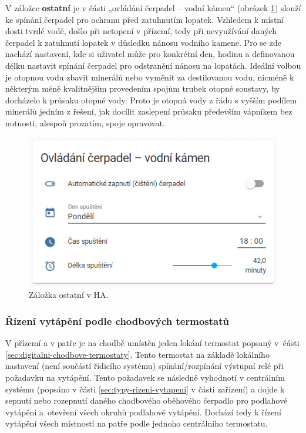V záložce \textbf{ostatní} je v části „ovládání čerpadel – vodní kámen“ (obrázek \ref{fig:zalozka-ostatni}) slouží ke spínání čerpadel pro ochranu před zatuhnutím lopatek. Vzhledem k místní dosti tvrdé vodě, došlo při netopení v přízemí, tedy při nevyužívání daných čerpadel k zatuhnutí lopatek v důsledku nánosu vodního kamene. Pro se zde nachází nastavení, kde si uživatel může pro konkrétní den, hodinu a definovanou délku nastavit spínání čerpadel pro odstranění nánosu na lopatách. Ideální volbou je otopnou vodu zbavit minerálů nebo vyměnit za destilovanou vodu, nicméně k některým méně kvalitnějším provedením spojům trubek otopné soustavy, by docházelo k průsaku otopné vody. Proto je otopná vody z řádu s vyšším podílem minerálů jedním z řešení, jak docílit zaslepení průsaku především vápníkem bez nutnosti, alespoň prozatím, spoje opravovat.

\begin{figure}[H]
    \centering
    \includegraphics[width=\textwidth]{images/software-ha/zalozka-ostatni.png}
    \caption{Záložka ostatní v HA.}
    \label{fig:zalozka-ostatni}
\end{figure}


\subsubsection{Řízení vytápění podle chodbových termostatů}
V přízemí a v patře je na chodbě umístěn jeden lokání termostat popsaný v~části \ref{sec:digitalni-chodbove-termostaty}. Tento termostat na základě lokálního nastavení (není součástí řídicího systému) spínání/rozpínání výstupní relé při požadavku na vytápění. Tento požadavek se následně vyhodnotí v centrálním systému (popsáno v části \ref{sec:typy-rizeni-vytapeni} v části zařízení) a dojde k sepnutí nebo rozepnutí daného chodbového oběhového čerpadlo pro podlahové vytápění a~otevření všech okruhů podlahové vytápění. Dochází tedy k řízení vytápění všech místností na patře podle jednoho centrálního termostatu. 

